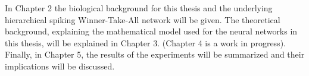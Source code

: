In Chapter 2 the biological background for this thesis and the underlying hierarchical spiking Winner-Take-All network will be given. The theoretical background, explaining the mathematical model used for the neural networks in this thesis, will be explained in Chapter 3. (Chapter 4 is a work in progress). Finally, in Chapter 5, the results of the experiments will be summarized and their implications will be discussed.